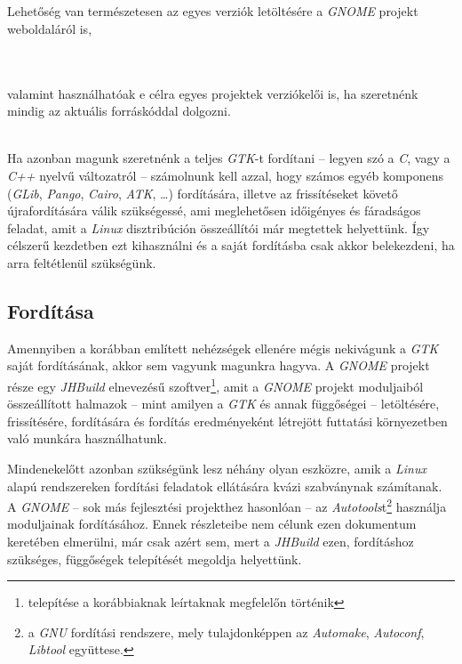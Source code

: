 \\
\\

Lehetőség van természetesen az egyes verziók letöltésére a \textit{GNOME} projekt weboldaláról is,

\\
\\

valamint használhatóak e célra egyes projektek verziókelői is, ha szeretnénk mindig az aktuális forráskóddal dolgozni.

\\

Ha azonban magunk szeretnénk a teljes \textit{GTK}-t fordítani -- legyen szó a \textit{C}, vagy a \textit{C++} nyelvű változatról -- számolnunk kell azzal, hogy számos egyéb komponens (\textit{GLib}, \textit{Pango}, \textit{Cairo}, \textit{ATK}, \dots) fordítására, illetve az frissítéseket követő újrafordítására válik szükségessé, ami meglehetősen időigényes és fáradságos feladat, amit a \textit{Linux} disztribúción összeállítói már megtettek helyettünk. Így célszerű kezdetben ezt kihasználni és a saját fordításba csak akkor belekezdeni, ha arra feltétlenül szükségünk.

\subsection{Fordítása}

Amennyiben a korábban említett nehézségek ellenére mégis nekivágunk a \textit{GTK} saját fordításának, akkor sem vagyunk magunkra hagyva. A \textit{GNOME} projekt része egy \textit{JHBuild} elnevezésű szoftver\footnote{telepítése a korábbiaknak leírtaknak megfelelőn történik}, amit a \textit{GNOME} projekt moduljaiból összeállított halmazok -- mint amilyen a \textit{GTK} és annak függőségei -- letöltésére, frissítésére, fordítására és fordítás eredményeként létrejött futtatási környezetben való munkára használhatunk.

Mindenekelőtt azonban szükségünk lesz néhány olyan eszközre, amik a \textit{Linux} alapú rendszereken fordítási feladatok ellátására kvázi szabványnak számítanak. A \textit{GNOME} -- sok más fejlesztési projekthez hasonlóan -- az \textit{Autotools}t\footnote{a \textit{GNU} fordítási rendszere, mely tulajdonképpen az \textit{Automake}, \textit{Autoconf}, \textit{Libtool} együttese.} használja moduljainak fordításához. Ennek részleteibe nem célunk ezen dokumentum keretében elmerülni, már csak azért sem, mert a \textit{JHBuild} ezen, fordításhoz szükséges, függőségek telepítését megoldja helyettünk.

